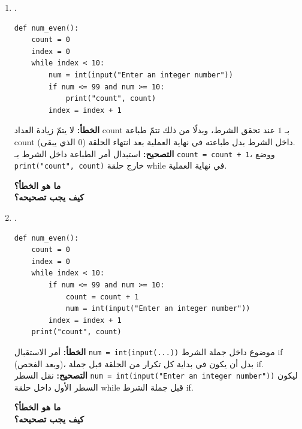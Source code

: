 \documentclass[14pt]{extarticle}
\begin{document}
\begin{enumerate}[label=\textbf{السؤال \arabic*:}, wide=0pt, itemsep=2.2em]
\begin{enumerate}[label=\textbf{مقطع \alph*:}, wide=0pt, itemsep=1.5em]
\item .
\begin{boxCode}
\begin{english}
\begin{verbatim}
def num_even():
    count = 0
    index = 0
    while index < 10:
        num = int(input("Enter an integer number"))
        if num <= 99 and num >= 10:
            print("count", count)
        index = index + 1
\end{verbatim}
\end{english}
\end{boxCode}
\ifwithsols
\begin{boxSolution}
\textbf{الخطأ:} لا يتمّ زيادة العداد \textenglish{count} بـ $1$ عند تحقق الشرط، وبدلًا من ذلك تتمّ طباعة \textenglish{count} (الذي يبقى $0$) داخل الشرط بدل طباعته في نهاية العملية بعد انتهاء الحلقة. \\
\textbf{التصحيح:} استبدال أمر الطباعة داخل الشرط بـ \textenglish{\texttt{count = count + 1}}، ووضع \textenglish{\texttt{print("count", count)}} خارج حلقة \textenglish{while} في نهاية العملية.
\end{boxSolution}
\else
\textbf{ما هو الخطأ؟} \underline{\hspace{11cm}} \\
\textbf{كيف يجب تصحيحه؟} \underline{\hspace{10cm}}
\fi
\filbreak

\item .
\begin{boxCode}
\begin{english}
\begin{verbatim}
def num_even():
    count = 0
    index = 0
    while index < 10:
        if num <= 99 and num >= 10:
            count = count + 1
            num = int(input("Enter an integer number"))
        index = index + 1
    print("count", count)
\end{verbatim}
\end{english}
\end{boxCode}
\ifwithsols
\begin{boxSolution}
\textbf{الخطأ:} أمر الاستقبال \textenglish{\texttt{num = int(input(...))}} موضوع داخل جملة الشرط \textenglish{if} (وبعد الفحص)، بدل أن يكون في بداية كل تكرار من الحلقة قبل جملة \textenglish{if}. \\
\textbf{التصحيح:} نقل السطر \textenglish{\texttt{num = int(input("Enter an integer number"))}} ليكون السطر الأول داخل حلقة \textenglish{while} قبل جملة الشرط \textenglish{if}.
\end{boxSolution}
\else
\textbf{ما هو الخطأ؟} \underline{\hspace{11cm}} \\
\textbf{كيف يجب تصحيحه؟} \underline{\hspace{10cm}}
\fi
\filbreak

\end{enumerate}
\filbreak

\end{enumerate}
\end{document}
